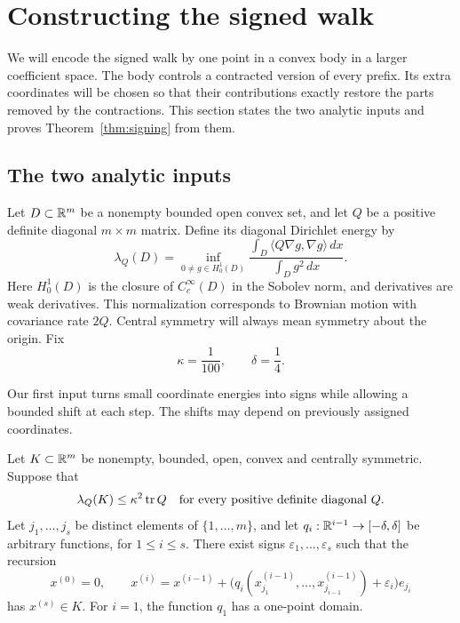 \section{Constructing the signed walk}\label{sec:construction}

We will encode the signed walk by one point in a convex body in a larger
coefficient space.  The body controls a contracted version of every prefix.
Its extra coordinates will be chosen so that their contributions exactly
restore the parts removed by the contractions.  This section states the two
analytic inputs and proves Theorem~\ref{thm:signing} from them.

\subsection{The two analytic inputs}

Let $D\subset\mathbb R^m$ be a nonempty bounded open convex set, and let $Q$ be a
positive definite diagonal $m\times m$ matrix.  Define its diagonal Dirichlet
energy by
\begin{equation}\label{eq:dirichlet-energy}
 \lambda_Q(D)=
 \inf_{0\ne g\in H^1_0(D)}
 \frac{\displaystyle\int_D\langle Q\nabla g,\nabla g\rangle\,dx}
      {\displaystyle\int_Dg^2\,dx}.
\end{equation}
Here $H^1_0(D)$ is the closure of $C_c^\infty(D)$ in the Sobolev norm, and
derivatives are weak derivatives.  This normalization corresponds to
Brownian motion with covariance rate $2Q$.  Central symmetry will always
mean symmetry about the origin.  Fix
\begin{equation}\label{eq:signing-constants}
 \kappa=\frac1{100},\qquad \delta=\frac14.
\end{equation}

Our first input turns small coordinate energies into signs while allowing a
bounded shift at each step.  The shifts may depend on previously assigned
coordinates.

\begin{proposition}\label{prop:adaptive}
Let $K\subset\mathbb R^m$ be nonempty, bounded, open, convex and centrally
symmetric.  Suppose that
\begin{equation}\label{eq:all-diagonal-energy}
 \lambda_Q(K)\le\kappa^2\operatorname{tr} Q
 \quad\text{for every positive definite diagonal }Q.
\end{equation}
Let $j_1,\ldots,j_s$ be distinct elements of $\{1,\ldots,m\}$, and let
$q_i:\mathbb R^{i-1}\to[-\delta,\delta]$ be arbitrary functions, for
$1\le i\le s$.  There exist signs $\varepsilon_1,\ldots,\varepsilon_s$
such that the recursion
\[
 x^{(0)}=0,\qquad
 x^{(i)}=x^{(i-1)}+
 \bigl(q_i(x^{(i-1)}_{j_1},\ldots,x^{(i-1)}_{j_{i-1}})
       +\varepsilon_i\bigr)e_{j_i}
\]
has $x^{(s)}\in K$.  For $i=1$, the function $q_1$ has a one-point domain.
\end{proposition}

